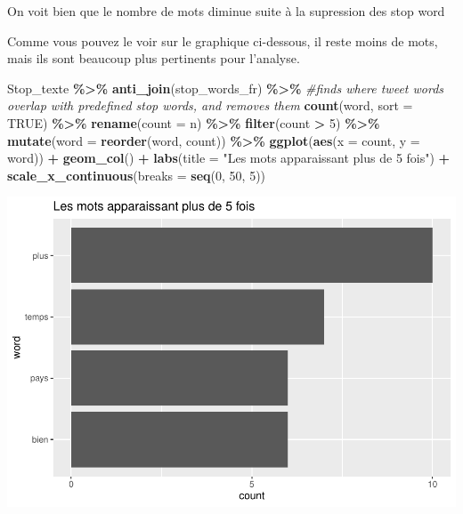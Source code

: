 \documentclass[
]{article}
\newenvironment{Shaded}{\begin{snugshade}}{\end{snugshade}}
\newcommand{\AttributeTok}[1]{\textcolor[rgb]{0.13,0.29,0.53}{#1}}
\newcommand{\CommentTok}[1]{\textcolor[rgb]{0.56,0.35,0.01}{\textit{#1}}}
\newcommand{\ConstantTok}[1]{\textcolor[rgb]{0.56,0.35,0.01}{#1}}
\newcommand{\DecValTok}[1]{\textcolor[rgb]{0.00,0.00,0.81}{#1}}
\newcommand{\FunctionTok}[1]{\textcolor[rgb]{0.13,0.29,0.53}{\textbf{#1}}}
\newcommand{\NormalTok}[1]{#1}
\newcommand{\SpecialCharTok}[1]{\textcolor[rgb]{0.81,0.36,0.00}{\textbf{#1}}}
\newcommand{\StringTok}[1]{\textcolor[rgb]{0.31,0.60,0.02}{#1}}
\begin{document}
On voit bien que le nombre de mots diminue suite à la supression des
stop word

Comme vous pouvez le voir sur le graphique ci-dessous, il reste moins de
mots, mais ils sont beaucoup plus pertinents pour l'analyse.

\begin{Shaded}
\begin{Highlighting}[]
\NormalTok{Stop\_texte }\SpecialCharTok{\%\textgreater{}\%}
  \FunctionTok{anti\_join}\NormalTok{(stop\_words\_fr) }\SpecialCharTok{\%\textgreater{}\%} \CommentTok{\#finds where tweet words overlap with predefined stop words, and removes them}
  \FunctionTok{count}\NormalTok{(word, }\AttributeTok{sort =} \ConstantTok{TRUE}\NormalTok{) }\SpecialCharTok{\%\textgreater{}\%}
  \FunctionTok{rename}\NormalTok{(}\AttributeTok{count =}\NormalTok{ n) }\SpecialCharTok{\%\textgreater{}\%}
  \FunctionTok{filter}\NormalTok{(count }\SpecialCharTok{\textgreater{}} \DecValTok{5}\NormalTok{) }\SpecialCharTok{\%\textgreater{}\%}
  \FunctionTok{mutate}\NormalTok{(}\AttributeTok{word =} \FunctionTok{reorder}\NormalTok{(word, count)) }\SpecialCharTok{\%\textgreater{}\%}
  \FunctionTok{ggplot}\NormalTok{(}\FunctionTok{aes}\NormalTok{(}\AttributeTok{x =}\NormalTok{ count, }\AttributeTok{y =}\NormalTok{ word)) }\SpecialCharTok{+} 
  \FunctionTok{geom\_col}\NormalTok{() }\SpecialCharTok{+} 
  \FunctionTok{labs}\NormalTok{(}\AttributeTok{title =} \StringTok{"Les mots apparaissant plus de 5 fois"}\NormalTok{) }\SpecialCharTok{+} 
  \FunctionTok{scale\_x\_continuous}\NormalTok{(}\AttributeTok{breaks =} \FunctionTok{seq}\NormalTok{(}\DecValTok{0}\NormalTok{, }\DecValTok{50}\NormalTok{, }\DecValTok{5}\NormalTok{))}
\end{Highlighting}
\end{Shaded}

\includegraphics{Texte_mining_files/figure-latex/unnamed-chunk-9-1.pdf}
\end{document}
